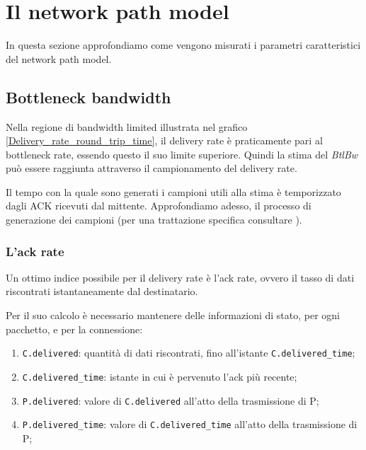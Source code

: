 \section{Il network path model}

In questa sezione approfondiamo come vengono misurati i parametri caratteristici del network path model.

\subsection{Bottleneck bandwidth} 

Nella regione di bandwidth limited illustrata nel grafico \ref{Delivery_rate_round_trip_time}, il delivery rate è praticamente pari al bottleneck rate, essendo questo il suo limite superiore. Quindi la stima del \textit{BtlBw} può essere raggiunta attraverso il campionamento del delivery rate. \bigskip

Il tempo con la quale sono generati i campioni utili alla stima è temporizzato dagli ACK ricevuti dal mittente.
Approfondiamo adesso, il processo di generazione dei campioni (per una trattazione specifica consultare \cite{ietf:draft-cheng-iccrg-delivery-rate-estimation-00}). \bigskip

\subsubsection{L'ack rate}

Un ottimo indice possibile per il delivery rate è l'ack rate, ovvero il tasso di dati riscontrati istantaneamente dal destinatario. \bigskip

Per il suo calcolo è necessario mantenere delle informazioni di stato, per ogni pacchetto, e per la connessione:

\begin{enumerate}

\item \texttt{C.delivered}: quantità di dati riscontrati, fino all’istante \texttt{C.delivered\_time};

\item \texttt{C.delivered\_time}: istante in cui è pervenuto l’ack più recente;

\item \texttt{P.delivered}: valore di \texttt{C.delivered} all’atto della trasmissione di P;

\item \texttt{P.delivered\_time}: valore di \texttt{C.delivered\_time} all’atto della trasmissione di P;

\end{enumerate}

